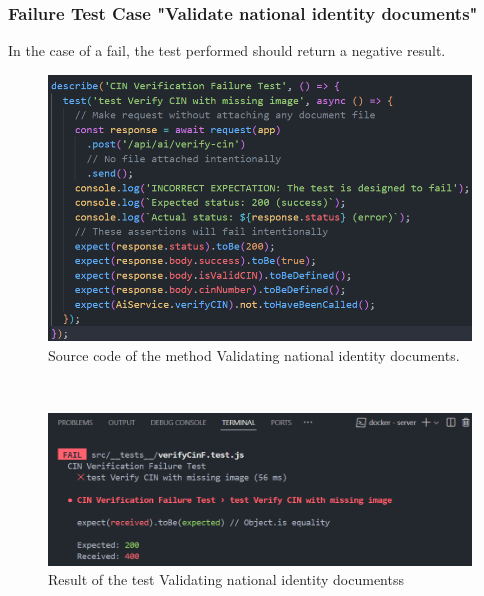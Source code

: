 \subsubsection{Failure Test Case "Validate national identity documents"}
In the case of a fail, the test performed should return a negative result.
\begin{figure}[h!]
    \centering
    \includegraphics[width=1\textwidth]{figures/validate idF code.png}
    \caption{Source code of the method Validating national identity documents.}
\end{figure} \
\clearpage
\begin{figure}[h!]
    \centering
    \includegraphics[width=1\textwidth]{figures/result validate national idF.png}  
    \caption{Result of the test Validating national identity documentss}
\end{figure} \

